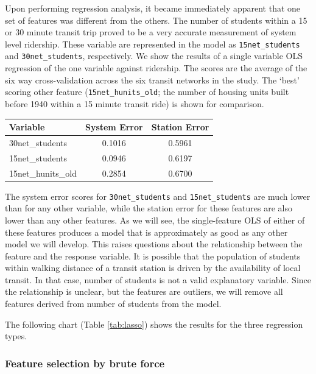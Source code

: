 \documentclass{article}
\begin{document}
Upon performing regression analysis, it became immediately apparent that one set of features was different from the others. The number of students within a 15 or 30 minute transit trip proved to be a very accurate measurement of system level ridership. These variable are represented in the model as \texttt{15net\_students} and \texttt{30net\_students}, respectively. We show the results of a single variable OLS regression of the one variable against ridership. The scores are the average of the six way cross-validation across the six transit networks in the study. The `best' scoring other feature (\texttt{15net\_hunits\_old}; the number of housing units built before 1940 within a 15 minute transit ride) is shown for comparison.

\begin{table}[H]\label{tab:students}
\centering
\begin{tabular}{lcc}
\toprule Variable&System Error&Station Error\\
\midrule 30net\_students&0.1016&0.5961\\
15net\_students&0.0946&0.6197\\
15net\_hunits\_old&0.2854&0.6700\\ 
\bottomrule
\end{tabular}
\end{table}

The system error scores for \texttt{30net\_students} and \texttt{15net\_students} are much lower than for any other variable, while the station error for these features are also lower than any other features. As we will see, the single-feature OLS of either of these features produces a model that is approximately as good as any other model we will develop. This raises questions about the relationship between the feature and the response variable. It is possible that the population of students within walking distance of a transit station is driven by the availability of local transit. In that case, number of students is not a valid explanatory variable. Since the relationship is unclear, but the features are outliers, we will remove all features derived from number of students from the model.



 

The following chart (Table \ref{tab:lasso}) shows the results for the three regression types. 





\subsubsection{Feature selection by brute force}
\end{document}
